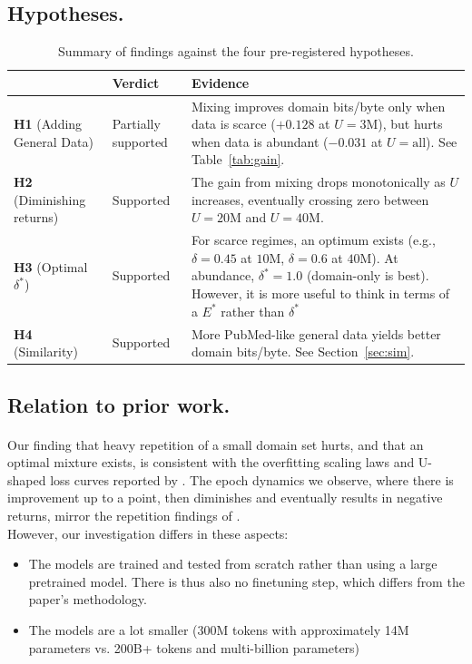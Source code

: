 \documentclass[10pt,a4paper]{article}
\newcommand{\bpb}{bits/byte}
\begin{document}
\subsection{Hypotheses.} 
\begin{table}[h]\centering\small
\renewcommand{\arraystretch}{1.2}
\begin{tabular}{@{}l l p{9.8cm}@{}}\toprule
 & Verdict & Evidence \\\midrule
\textbf{H1} (Adding General Data) & Partially supported & Mixing improves domain \bpb{} only when data is scarce (\(+0.128\) at \(U=3\)M), but hurts when data is abundant (\(-0.031\) at \(U=\text{all}\)). See Table~\ref{tab:gain}. \\
\textbf{H2} (Diminishing returns) & Supported & The gain from mixing drops monotonically as \(U\) increases, eventually crossing zero between \(U=20\)M and \(U=40\)M. \\
\textbf{H3} (Optimal \(\delta^*\)) & Supported & For scarce regimes, an optimum exists (e.g., \(\delta=0.45\) at \(10\)M, \(\delta=0.6\) at \(40\)M). At abundance, \(\delta^*=1.0\) (domain-only is best). However, it is more useful to think in terms of a $E^*$ rather than $\delta^*$ \\
\textbf{H4} (Similarity) & Supported & More PubMed-like general data yields better domain \bpb{}. See Section~\ref{sec:sim}. \\\bottomrule
\end{tabular}
\caption{Summary of findings against the four pre-registered hypotheses.}
\label{tab:hypotheses}
\end{table}

\newpage
\subsection{Relation to prior work.} 
\paragraph{}Our finding that heavy repetition of a small domain set hurts, and that an optimal mixture exists, is consistent with the overfitting scaling laws and U-shaped loss curves reported by \cite{spt2026}. The epoch dynamics we observe, where there is improvement up to a point, then diminishes and eventually results in negative returns, mirror the repetition findings of \cite{muennighoff2023dataconstrained}. \\
However, our investigation differs in these aspects: 
\begin{itemize}
\item The models are trained and tested from scratch rather than using a large pretrained model. There is thus also no finetuning step, which differs from the paper's methodology.
\item The models are a lot smaller (300M tokens with approximately 14M parameters vs. 200B+ tokens and multi-billion parameters)
\end{itemize}
\end{document}
